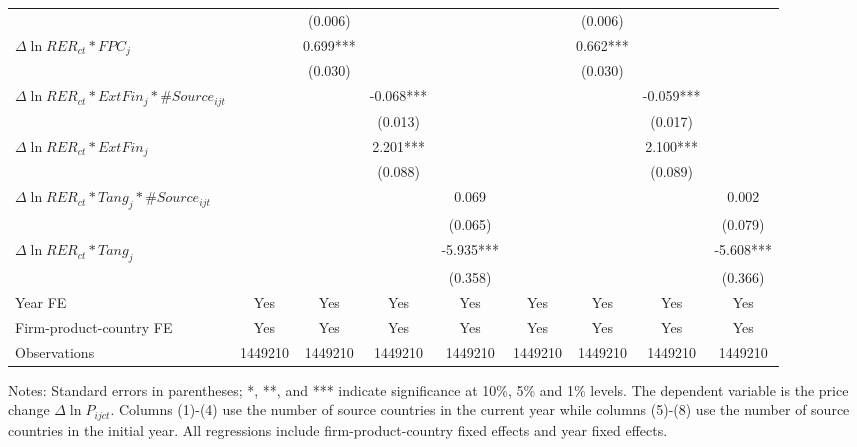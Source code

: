 \documentclass[12pt]{article}
\begin{document}
\begin{table}
{\begin{threeparttable}
\begin{tabular}{lcccccccc}
			&       & (0.006) &       &  &       & (0.006) &       &\\
			$\Delta \ln RER_{ct}*FPC_{j}$ &       & 0.699*** &       &  &       & 0.662*** &       &\\
			&       & (0.030) &       & &       & (0.030) &       & \\
			$\Delta \ln RER_{ct}*ExtFin_{j}*\#Source_{ijt}$ &       &    &   -0.068*** &  &       &    &   -0.059*** &\\
			&       &       & (0.013) &  &       &       & (0.017) &\\
			$\Delta \ln RER_{ct}*ExtFin_{j}$ &       &       & 2.201*** &   &       &       & 2.100*** &\\
			&       &       & (0.088) &  &       &       & (0.089) &\\
			$\Delta \ln RER_{ct}*Tang_{j}*\#Source_{ijt}$ &       &       &       & 0.069 &       &       &       & 0.002\\
			&       &       &       & (0.065) &       &       &       & (0.079)\\
			$\Delta \ln RER_{ct}*Tang_{j}$ &       &       &       & -5.935*** &       &       &       & -5.608***\\
			&       &       &       & (0.358) &       &       &       & (0.366)\\
			Year FE  & Yes   & Yes   & Yes   & Yes & Yes   & Yes   & Yes   & Yes\\
			Firm-product-country FE & Yes   & Yes   & Yes   & Yes & Yes   & Yes   & Yes   & Yes\\
			Observations & 1449210 & 1449210 & 1449210 & 1449210 & 1449210 & 1449210 & 1449210 & 1449210\\
			\bottomrule
		\end{tabular}
		\begin{tablenotes}
			\footnotesize
			\item[Notes:] Standard errors in parentheses; *, **, and *** indicate significance at 10\%, 5\% and 1\% levels. The dependent variable is the price change $\Delta \ln P_{ijct}$. Columns (1)-(4) use the number of source countries in the current year while columns (5)-(8) use the number of source countries in the initial year. All regressions include firm-product-country fixed effects and year fixed effects.
		\end{tablenotes}
	\end{threeparttable}
	}
	\label{tab.source}
\end{table}
\end{document}
